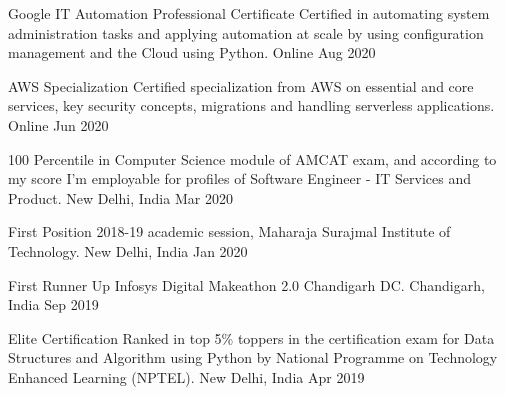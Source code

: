 



\begin{cvhonors}

    
  \cvhonor
    {Google IT Automation Professional Certificate} %
    {Certified in automating system administration tasks and  applying automation at scale by using configuration management and the Cloud using Python.
} %
    {Online} %
    {Aug 2020} %

  \cvhonor
    {AWS Specialization} %
    {Certified specialization from AWS on essential and core services, key security concepts, migrations and handling serverless applications.
} %
    {Online} %
    {Jun 2020} %
    
  \cvhonor
    {100 Percentile} %
    {in Computer Science module of AMCAT exam, and according to my score I'm employable for profiles of Software Engineer - IT Services and Product.} %
    {New Delhi, India} %
    {Mar 2020} %

  \cvhonor
    {First Position} %
    {2018-19 academic session, Maharaja Surajmal Institute of Technology.} %
    {New Delhi, India} %
    {Jan 2020} %

  \cvhonor
    {First Runner Up} %
    {Infosys Digital Makeathon 2.0 Chandigarh DC.} %
    {Chandigarh, India} %
    {Sep 2019} %

  \cvhonor
    {Elite Certification} %
    {Ranked in top 5\% toppers in the certification exam for Data Structures and Algorithm using Python by National Programme on Technology Enhanced Learning (NPTEL).} %
    {New Delhi, India} %
    {Apr 2019} %

\end{cvhonors}

